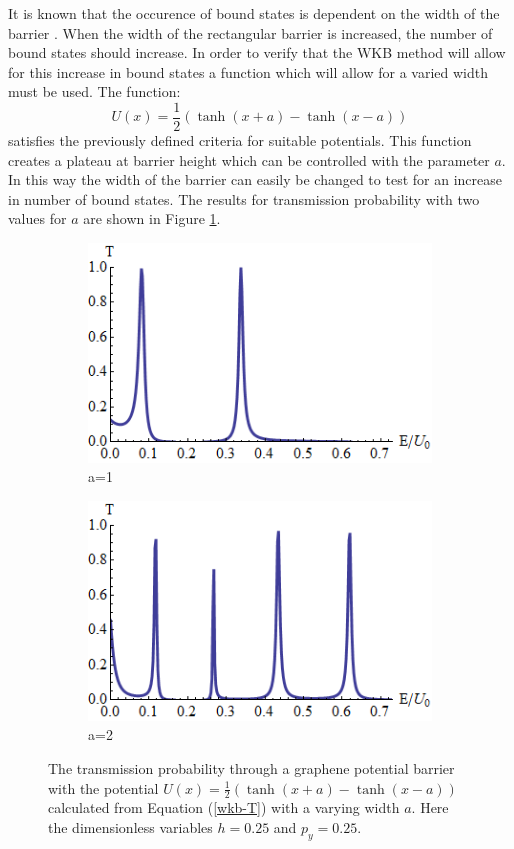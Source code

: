 		It is known that the occurence of bound states is dependent on the width of the barrier \cite{b3}. When the width of the rectangular barrier is increased, the number of bound states should increase. In order to verify that the WKB method will allow for this increase in bound states a function which will allow for a varied width must be used. The function:
		\begin{equation}
			U\left(x\right)=\frac{1}{2}\left(\tanh(x+a)-\tanh(x-a)\right)
		\end{equation}
		satisfies the previously defined criteria for suitable potentials. This function creates a plateau at barrier height which can be controlled with the parameter $a$. In this way the width of the barrier can easily be changed to test for an increase in number of bound states. The results for transmission probability with two values for $a$ are shown in Figure \ref{graphene-wkb-results-a1}.
		\begin{figure}[h]
			 \begin{subfigure}[h!]{0.5\textwidth}
				\centerline{\includegraphics[scale=0.6]{images/graphene-wkb-results-a1}}
				\caption{a=1}
			\end{subfigure}
			\begin{subfigure}[h!]{0.5\textwidth}
				\centerline{\includegraphics[scale=0.6]{images/graphene-wkb-results-a2}}
				\caption{a=2}
			\end{subfigure}
			\caption{The transmission probability through a graphene potential barrier with the potential $U\left(x\right)=\frac{1}{2}\left(\tanh(x+a)-\tanh(x-a)\right)$ calculated from Equation (\ref{wkb-T}) with a varying width $a$. Here the dimensionless variables $h=0.25$ and $p_{y}=0.25$.}
			\label{graphene-wkb-results-a1}
		\end{figure}

